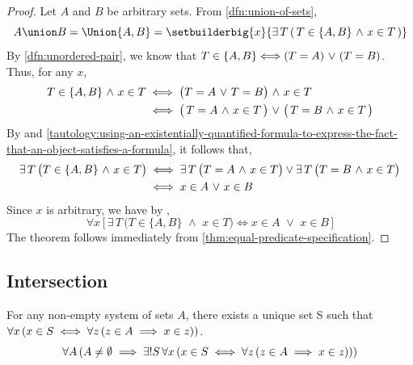 \begin{proof}
    Let \( A \) and \( B \) be arbitrary sets. From \cref{dfn:union-of-sets},
    \begin{equation*}
        A \union B = \Union \mleft\{ A, B \mright\} = \setbuilderbig{x}{\exists \, T \, \mleft(\, T \in \mleft\{ A, B \mright\} \,\,{\land}\,\, x \in T \,\mright) }
    \end{equation*}
    By \cref{dfn:unordered-pair}, we know that \( T \in \mleft\{ A, B \mright\} {\iff} \mleft( T = A \mright) \,\,{\lor}\,\, \mleft( T = B \mright) \).
    Thus, for any \( x \),
    \begin{align}
        \label{eq:distributive-law-of-logical-and-over-or}
        T \in \mleft\{ A,B \mright\} \,\,{\land}\,\, x \in T
        &\iff
        \big( T = A \,\,{\lor}\,\, T = B \big) \,\,{\land}\,\, x \in T \notag \\
        &\iff
        \big(\, T = A \,\,{\land}\,\, x \in T \,\big) \,\,{\lor}\,\, \big(\, T = B \,\,{\land}\,\, x \in T \,\big)
    \end{align}
    By  and
    \cref{tautology:using-an-existentially-quantified-formula-to-express-the-fact-that-an-object-satisfies-a-formula},
    it follows that,
    \begin{align}
        \label{eq:equivalent-predicate-for-union-of-pair}
        \exists \, T \, \big( T \in \{ A,B \} \,\,{\land}\,\, x \in T \big)
        &\iff
        \exists \, T \, \big( T = A \,\,{\land}\,\, x \in T \big) \lor
        \exists \, T \, \big( T = B \,\,{\land}\,\, x \in T \big) \notag \\
        &\iff x \in A \,\,{\lor}\,\, x \in B
    \end{align}
    Since \( x \) is arbitrary, we have by ,
    \begin{equation*}
        \forall x \, \Big[\, \exists \, T \, \big( T \in \{ A,B \} \,\,{\land}\,\, x \in T \big)
        \iff x \in A \,\,{\lor}\,\, x \in B \,\Big]
    \end{equation*}
    The theorem follows immediately from \cref{thm:equal-predicate-specification}.
\end{proof}

\subsection{Intersection}
\begin{thm}
    \label{thm:existence-and-uniqueness-of-intersection}
    For any non-empty system of sets \( A \), there exists a unique set S such that
    \( \forall x \, \mleft( x \in S \iff
    \forall z \, \mleft( z \in A \implies x \in z \mright) \mright) \).
    \begin{equation*}
        \forall A \, \mleft( A \neq \emptyset \implies
        \exists! S \, \forall x \, \mleft( x \in S
        \iff \forall z \, \mleft( z \in A \implies x \in z \mright) \mright) \mright)
    \end{equation*}
\end{thm}


